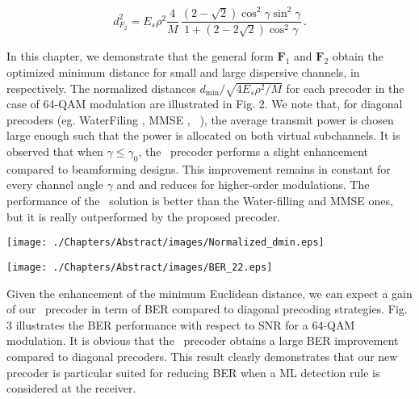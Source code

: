 \begin{equation}
\label{eq_ab3_dmin_F2}
	d^2_{F_{2}} = E_s \rho^2 \frac{4}{M} \, \frac{(2-\sqrt{2}) \cos^2 \gamma \sin^2 \gamma }{1+ (2-2\sqrt{2}) \cos^2 \gamma} \, .
\end{equation}

In this chapter, we demonstrate that the general form $\mathbf{F}_1$ and $\mathbf{F}_2$ obtain the optimized minimum distance for small and large dispersive channels, in respectively. The normalized distances $d_{\min}/\sqrt{4E_s \rho^2 /M}$ for each precoder in the case of 64-QAM modulation are illustrated in Fig. 2. We note that, for diagonal precoders (eg. WaterFiling \cite{telatar1999cma}, MMSE \cite{sampath2001glp}, \maxlmin\ \cite{scaglione2002ods}), the average transmit power is chosen large enough such that the power is allocated on both virtual subchannels. It is observed that when $\gamma \leq \gamma_0$, the \maxdmin\ precoder performs a slight enhancement compared to beamforming designs. This improvement remains in constant for every channel angle $\gamma$ and and reduces for higher-order modulations. The performance of the \maxlmin\ solution is better than the Water-filling and MMSE ones, but it is really outperformed by the proposed precoder. 
\begin{center}
\texttt{[image: ./Chapters/Abstract/images/Normalized\_dmin.eps]}
\end{center} 

\begin{center}
\texttt{[image: ./Chapters/Abstract/images/BER\_22.eps]}
\end{center} 

Given the enhancement of the minimum Euclidean distance, we can expect a gain of our \maxdmin\ precoder in term of BER compared to diagonal precoding strategies. Fig. 3 illustrates the BER performance with respect to SNR for a 64-QAM modulation. It is obvious that the \maxdmin\ precoder obtains a large BER improvement compared to diagonal precoders. This result clearly demonstrates that our new precoder is particular suited for reducing BER when a ML detection rule is considered at the receiver.

